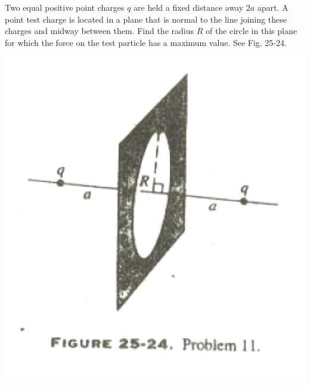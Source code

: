 \documentclass[11pt,letterpaper,boxed]{hmcpset}
\begin{document}
	\begin{problem}[HRK P25.11]
		Two equal positive point charges $q$ are held a fixed distance away $2a$ apart. A point test charge is located in a plane that is normal to the line joining these charges and midway between them. Find the radius $R$ of the circle in this plane for which the force on the test particle has a maximum value. See Fig. 25-24.
		
		\begin{center}
			\includegraphics[scale=0.5]{25-24.png}
		\end{center}
		
	\end{problem}
	
	\begin{solution}
		\vfill
	\end{solution}
	
\end{document}
